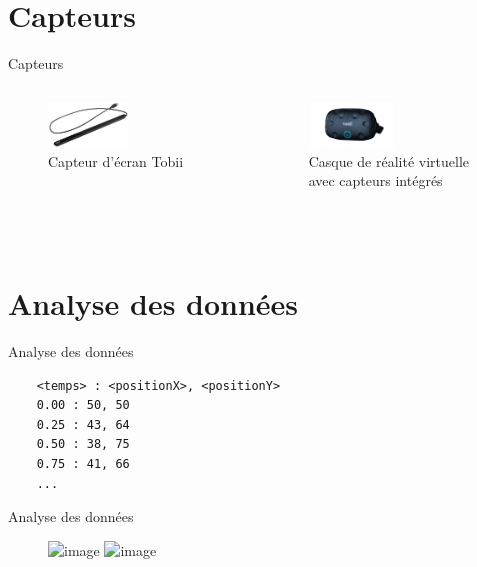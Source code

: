 \documentclass{beamer}
\begin{document}
\section{Capteurs}
\begin{frame}{Capteurs}
  \begin{columns}
    \begin{figure}
      \includegraphics[height=0.35\textwidth]{tobii.jpeg}
      \caption{Capteur d'écran Tobii}
    \end{figure}
    \begin{figure}
      \includegraphics[height=0.35\textwidth]{htcvive.png}
      \caption{Casque de réalité virtuelle avec capteurs intégrés}
    \end{figure}
  \end{columns}
\end{frame}
\section{Analyse des données}
\begin{frame}[fragile]{Analyse des données}
  \begin{lstlisting}
    <temps> : <positionX>, <positionY>
    0.00 : 50, 50
    0.25 : 43, 64
    0.50 : 38, 75
    0.75 : 41, 66
    ...
  \end{lstlisting}
\end{frame}
\begin{frame}{Analyse des données}
  \begin{figure}
    \includegraphics<1>[height=0.5\textwidth]{raw.png}
    \includegraphics<2>[height=0.5\textwidth]{heatmap.png}
    \caption{
    }
  \end{figure}
\end{frame}
\end{document}
